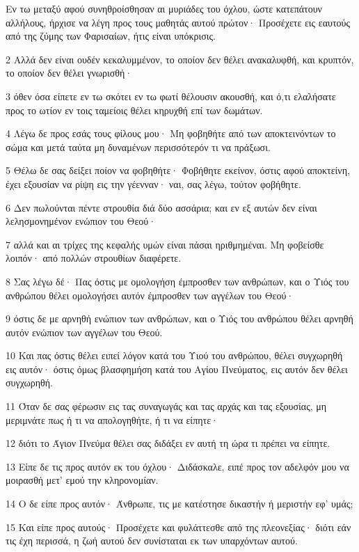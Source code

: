 \par Εν τω μεταξύ αφού συνηθροίσθησαν αι μυριάδες του όχλου, ώστε κατεπάτουν αλλήλους, ήρχισε να λέγη προς τους μαθητάς αυτού πρώτον· Προσέχετε εις εαυτούς από της ζύμης των Φαρισαίων, ήτις είναι υπόκρισις.
\par 2 Αλλά δεν είναι ουδέν κεκαλυμμένον, το οποίον δεν θέλει ανακαλυφθή, και κρυπτόν, το οποίον δεν θέλει γνωρισθή·
\par 3 όθεν όσα είπετε εν τω σκότει εν τω φωτί θέλουσιν ακουσθή, και ό,τι ελαλήσατε προς το ωτίον εν τοις ταμείοις θέλει κηρυχθή επί των δωμάτων.
\par 4 Λέγω δε προς εσάς τους φίλους μου· Μη φοβηθήτε από των αποκτεινόντων το σώμα και μετά ταύτα μη δυναμένων περισσότερόν τι να πράξωσι.
\par 5 Θέλω δε σας δείξει ποίον να φοβηθήτε· Φοβήθητε εκείνον, όστις αφού αποκτείνη, έχει εξουσίαν να ρίψη εις την γέενναν· ναι, σας λέγω, τούτον φοβήθητε.
\par 6 Δεν πωλούνται πέντε στρουθία διά δύο ασσάρια; και εν εξ αυτών δεν είναι λελησμονημένον ενώπιον του Θεού·
\par 7 αλλά και αι τρίχες της κεφαλής υμών είναι πάσαι ηριθμημέναι. Μη φοβείσθε λοιπόν· από πολλών στρουθίων διαφέρετε.
\par 8 Σας λέγω δέ· Πας όστις με ομολογήση έμπροσθεν των ανθρώπων, και ο Υιός του ανθρώπου θέλει ομολογήσει αυτόν έμπροσθεν των αγγέλων του Θεού·
\par 9 όστις δε με αρνηθή ενώπιον των ανθρώπων, και ο Υιός του ανθρώπου θέλει αρνηθή αυτόν ενώπιον των αγγέλων του Θεού.
\par 10 Και πας όστις θέλει ειπεί λόγον κατά του Υιού του ανθρώπου, θέλει συγχωρηθή εις αυτόν· όστις όμως βλασφημήση κατά του Αγίου Πνεύματος, εις αυτόν δεν θέλει συγχωρηθή.
\par 11 Όταν δε σας φέρωσιν εις τας συναγωγάς και τας αρχάς και τας εξουσίας, μη μεριμνάτε πως ή τι να απολογηθήτε, ή τι να είπητε·
\par 12 διότι το Άγιον Πνεύμα θέλει σας διδάξει εν αυτή τη ώρα τι πρέπει να είπητε.
\par 13 Είπε δε τις προς αυτόν εκ του όχλου· Διδάσκαλε, ειπέ προς τον αδελφόν μου να μοιρασθή μετ' εμού την κληρονομίαν.
\par 14 Ο δε είπε προς αυτόν· Άνθρωπε, τις με κατέστησε δικαστήν ή μεριστήν εφ' υμάς;
\par 15 Και είπε προς αυτούς· Προσέχετε και φυλάττεσθε από της πλεονεξίας· διότι εάν τις έχη περισσά, η ζωή αυτού δεν συνίσταται εκ των υπαρχόντων αυτού.

